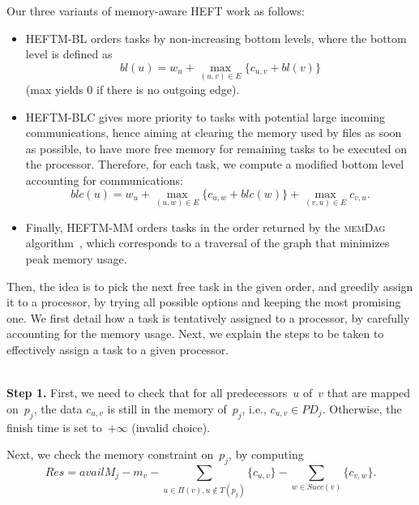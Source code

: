 \documentclass[conference]{IEEEtran}
\newcommand{\algo}[1]{\textsc{#1}}
\newcommand{\skug}[1]{{\color{blue}[SK: #1]}}
\begin{document}
Our three variants of memory-aware HEFT work as follows:
\begin{itemize}
\item    
  HEFTM-BL orders tasks by non-increasing bottom levels, where the bottom
  level is defined as
  $$bl(u) = w_u + \max_{(u,v)\in E} \{c_{u,v} + bl(v)\}$$
  (max yields $0$ if there is no outgoing edge).

\item    
  HEFTM-BLC %
  gives more priority to tasks with potential large incoming communications,
  hence aiming at clearing the memory used by files as soon as possible,
  to have more free memory for remaining tasks to be executed on the processor.
  Therefore, for each task, we compute a modified bottom level accounting for communications:
  $$blc(u) = w_u + \max_{(u,w)\in E} \{c_{u,w} + blc(w)\} + \max_{(v,u)\in E} c_{v,u}   . $$


\item   
  Finally, HEFTM-MM orders tasks  in the order returned by %
  the  \algo{memDag} algorithm~\cite{KAYAASLAN20181}, which corresponds to a traversal
  of the graph that minimizes peak memory usage.
\end{itemize}



\bigskip
{}

Then, the idea is to pick the next free task in the given order,
and greedily assign it to a processor, by trying all possible options
and keeping the most promising one. We first detail how a task
is tentatively assigned to a processor, by carefully accounting for the memory usage.
Next, we explain the steps to be taken to effectively assign a task to a given processor.

\medskip
{}\\
{\bf Step 1.} First, we need to check that for all predecessors~$u$ of~$v$ that are mapped
on~$p_j$, the data $c_{u,v}$ is still in the memory of~$p_j$,
i.e., $c_{u,v}\in PD_j$. Otherwise, the finish time is set to~$+\infty$ (invalid choice).

\smallskip
{} Next, we check the memory constraint on~$p_j$, by computing
$$Res = availM_j - m_v - \!\!\!\! \sum_{u \in \Pi(v), u\notin T(p_j)}  \!\!\!\!\!\!\!\!\{c_{u,v}\}
- \sum_{w\in Succ(v)} \!\!\!\!\!\! \{c_{v,w}\}.$$
\end{document}
